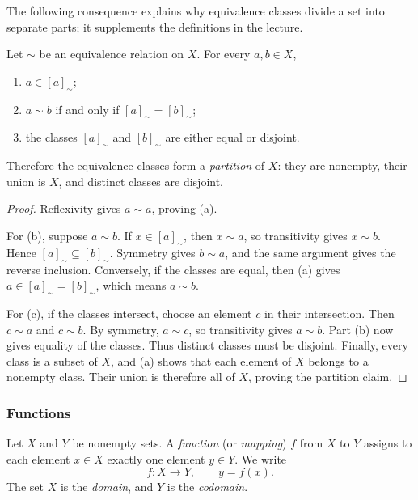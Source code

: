 \documentclass[11pt,a4paper]{amsart}
\begin{document}
The following consequence explains why equivalence classes divide a set into
separate parts; it supplements the definitions in the lecture.

\begin{proposition}
  Let \(\sim\) be an equivalence relation on \(X\). For every \(a,b \in X\),
  \begin{enumerate}[label=(\alph*)]
    \item \(a \in [a]_{\sim}\);
    \item \(a \sim b\) if and only if \([a]_{\sim} = [b]_{\sim}\);
    \item the classes \([a]_{\sim}\) and \([b]_{\sim}\) are either equal
      or disjoint.
  \end{enumerate}
  Therefore the equivalence classes form a \emph{partition} of \(X\):
  they are nonempty, their union is \(X\), and distinct classes are disjoint.
\end{proposition}

\begin{proof}
  Reflexivity gives \(a \sim a\), proving (a).

  For (b), suppose \(a \sim b\). If \(x \in [a]_{\sim}\), then
  \(x \sim a\), so transitivity gives \(x \sim b\). Hence
  \([a]_{\sim} \subseteq [b]_{\sim}\). Symmetry gives \(b \sim a\),
  and the same argument gives the reverse inclusion. Conversely, if the
  classes are equal, then (a) gives \(a \in [a]_{\sim} = [b]_{\sim}\),
  which means \(a \sim b\).

  For (c), if the classes intersect, choose an element \(c\) in their
  intersection. Then \(c \sim a\) and \(c \sim b\). By symmetry,
  \(a \sim c\), so transitivity gives \(a \sim b\). Part (b) now gives
  equality of the classes. Thus distinct classes must be disjoint.
  Finally, every class is a subset of \(X\), and (a) shows that each
  element of \(X\) belongs to a nonempty class. Their union is therefore
  all of \(X\), proving the partition claim.
\end{proof}

\subsubsection{Functions}

\begin{definition}
  Let \(X\) and \(Y\) be nonempty sets. A \emph{function} (or
  \emph{mapping}) \(f\) from \(X\) to \(Y\) assigns to each element
  \(x \in X\) exactly one element \(y \in Y\). We write
  \[
    f\colon X \longrightarrow Y,
    \qquad y = f(x).
  \]
  The set \(X\) is the \emph{domain}, and \(Y\) is the \emph{codomain}.
\end{definition}
\end{document}
